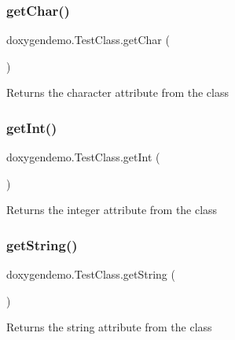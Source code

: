 \subsubsection{\texorpdfstring{get\+Char()}{getChar()}}
{\footnotesize\ttfamily doxygendemo.\+Test\+Class.\+get\+Char (\begin{DoxyParamCaption}{ }\end{DoxyParamCaption})}

\begin{DoxyReturn}{Returns}
the character attribute from the class 
\end{DoxyReturn}
\mbox{\label{classdoxygendemo_1_1_test_class_a70371a9bd69ded1856d919c36bd2f217}} 
\subsubsection{\texorpdfstring{get\+Int()}{getInt()}}
{\footnotesize\ttfamily doxygendemo.\+Test\+Class.\+get\+Int (\begin{DoxyParamCaption}{ }\end{DoxyParamCaption})}

\begin{DoxyReturn}{Returns}
the integer attribute from the class 
\end{DoxyReturn}
\mbox{\label{classdoxygendemo_1_1_test_class_ae17e0f53c5f1a33316cf76c7641f3ce4}} 
\subsubsection{\texorpdfstring{get\+String()}{getString()}}
{\footnotesize\ttfamily doxygendemo.\+Test\+Class.\+get\+String (\begin{DoxyParamCaption}{ }\end{DoxyParamCaption})}

\begin{DoxyReturn}{Returns}
the string attribute from the class 
\end{DoxyReturn}
\mbox{\label{classdoxygendemo_1_1_test_class_a8a38375f77528de05eee5adfe614560f}} 
